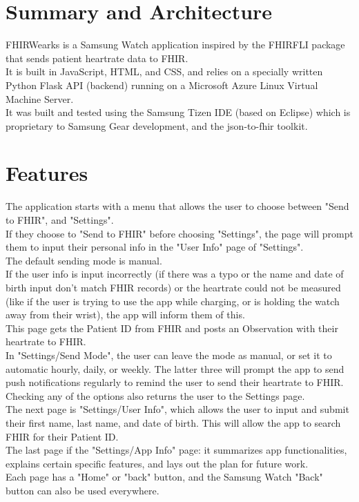 \documentclass{article}
\author{Alex Tcherdakoff}
\date{}
\begin{document}
	\maketitle
	\tableofcontents
	\section{Summary and Architecture}
	FHIRWearks is a Samsung Watch application inspired by the FHIRFLI package that sends patient heartrate data to FHIR.\\
	It is built in JavaScript, HTML, and CSS, and relies on a specially written Python Flask API (backend) running on a Microsoft Azure Linux Virtual Machine Server.\\
	It was built and tested using the Samsung Tizen IDE (based on Eclipse) which is proprietary to Samsung Gear development, and the json-to-fhir toolkit.
	\section{Features}
	The application starts with a menu that allows the user to choose between "Send to FHIR", and "Settings".\\
	If they choose to "Send to FHIR" before choosing "Settings", the page will prompt them to input their personal info in the "User Info" page of "Settings".\\
	The default sending mode is manual.\\
	If the user info is input incorrectly (if there was a typo or the name and date of birth input don't match FHIR records) or the heartrate could not be measured (like if the user is trying to use the app while charging, or is holding the watch away from their wrist), the app will inform them of this.\\
	This page gets the Patient ID from FHIR and posts an Observation with their heartrate to FHIR.\\
	In "Settings/Send Mode", the user can leave the mode as manual, or set it to automatic hourly, daily, or weekly. The latter three will prompt the app to send push notifications regularly to remind the user to send their heartrate to FHIR.\\
	Checking any of the options also returns the user to the Settings page.\\
	The next page is "Settings/User Info", which allows the user to input and submit their first name, last name, and date of birth. This will allow the app to search FHIR for their Patient ID.\\
	The last page if the "Settings/App Info" page: it summarizes app functionalities, explains certain specific features, and lays out the plan for future work.\\
	Each page has a "Home" or "back" button, and the Samsung Watch "Back" button can also be used everywhere.
\end{document}
